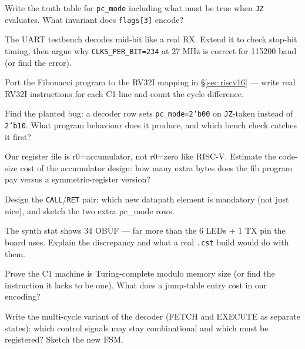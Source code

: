 \begin{exercise}[hard]
Write the truth table for \texttt{pc\_mode} including what must be
true when \texttt{JZ} evaluates. What invariant does
\texttt{flags[3]} encode?
\end{exercise}
\begin{exercise}[hard]
The UART testbench decodes mid-bit like a real RX. Extend it to check
stop-bit timing, then argue why \texttt{CLKS\_PER\_BIT=234} at 27 MHz
is correct for 115200 baud (or find the error).
\end{exercise}
\begin{exercise}[hard]
Port the Fibonacci program to the RV32I mapping in
\S\ref{sec:riscv16} --- write real RV32I instructions for each C1
line and count the cycle difference.
\end{exercise}
\begin{exercise}[hard]
Find the planted bug: a decoder row sets \texttt{pc\_mode=2'b00} on
\texttt{JZ}-taken instead of \texttt{2'b10}. What program behaviour
does it produce, and which bench check catches it first?
\end{exercise}
\begin{exercise}[hard]
Our register file is r0=accumulator, not r0=zero like RISC-V.
Estimate the code-size cost of the accumulator design: how many extra
bytes does the fib program pay versus a symmetric-register version?
\end{exercise}
\begin{exercise}[hard]
Design the \texttt{CALL}/\texttt{RET} pair: which new datapath
element is mandatory (not just nice), and sketch the two extra
pc\_mode rows.
\end{exercise}
\begin{exercise}[hard]
The synth stat shows 34 OBUF --- far more than the 6 LEDs + 1 TX pin
the board uses. Explain the discrepancy and what a real \texttt{.cst}
build would do with them.
\end{exercise}
\begin{exercise}[hard]
Prove the C1 machine is Turing-complete modulo memory size (or find
the instruction it lacks to be one). What does a jump-table entry
cost in our encoding?
\end{exercise}
\begin{exercise}[hard]
Write the multi-cycle variant of the decoder (FETCH and EXECUTE as
separate states): which control signals may stay combinational and
which must be registered? Sketch the new FSM.
\end{exercise}

